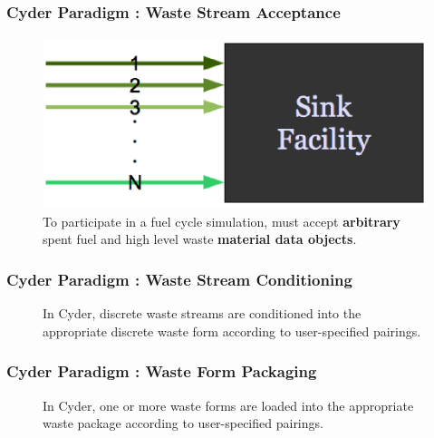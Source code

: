 \begin{frame}[ctb!]
  \frametitle{Cyder Paradigm : Waste Stream Acceptance}
  \begin{figure}[htbp!]
    \begin{center}
      \includegraphics[height=5cm]{./images/sinkfacility.eps}
    \end{center}
    \caption{ To participate in a \Cyclus fuel cycle simulation, \Cyder must 
      accept \textbf{arbitrary} spent fuel and high level waste \textbf{material 
      data objects}.}
    \label{fig:sinkfacility}
  \end{figure}
\end{frame}

\begin{frame}[ctb!]
  \frametitle{Cyder Paradigm : Waste Stream Conditioning}
  \footnotesize{
  
\begin{figure}[htbp!]
\begin{center}
\def\svgwidth{.5\textwidth}

\end{center}
\caption{In Cyder, discrete waste streams are conditioned into the appropriate 
discrete waste form according to user-specified pairings.}
\label{fig:ws_conditioning}
\end{figure}
}
\end{frame}

\begin{frame}[ctb!]
  \frametitle{Cyder Paradigm : Waste Form Packaging}
  \footnotesize{

\begin{figure}[htbp!]
\begin{center}
\def\svgwidth{.5\textwidth}

\end{center}
\caption{In Cyder, one or more waste forms are loaded into the appropriate 
waste package according to user-specified pairings.}
\label{fig:wf_packaging}
\end{figure}
}
\end{frame}

